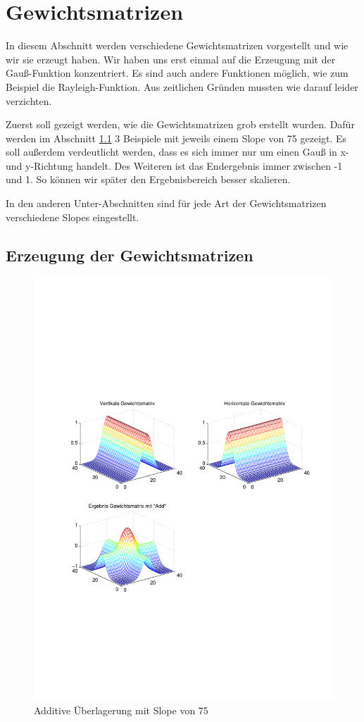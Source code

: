 \section{Gewichtsmatrizen}
In diesem Abschnitt werden verschiedene Gewichtsmatrizen vorgestellt und wie wir sie erzeugt haben. Wir haben uns erst einmal auf die Erzeugung mit der Gauß-Funktion konzentriert. Es sind auch andere Funktionen möglich, wie zum Beispiel die Rayleigh-Funktion. Aus zeitlichen Gründen mussten wie darauf leider verzichten.

Zuerst soll gezeigt werden, wie die Gewichtsmatrizen grob erstellt wurden. Dafür werden im Abschnitt \ref{eGew} 3 Beispiele mit jeweils einem Slope von 75 gezeigt. Es soll außerdem verdeutlicht werden, dass es sich immer nur um einen Gauß in x- und y-Richtung handelt. Des Weiteren ist das Endergebnis immer zwischen -1 und 1. So können wir später den Ergebnisbereich besser skalieren.

In den anderen Unter-Abschnitten sind für jede Art der Gewichtsmatrizen verschiedene Slopes eingestellt.

\newpage
\subsection{Erzeugung der Gewichtsmatrizen} \label{eGew}
\begin{figure}[hbt]
	\centering
	\includegraphics[width=1\linewidth]{./Bilder/Auswertung/GewichtmatrixEinzelschritte/Endergebnis_Gewichtsmatrix_Slope_75_Type_Add}
	\caption{Additive Überlagerung mit Slope von 75}
	\label{Add75}
\end{figure}

